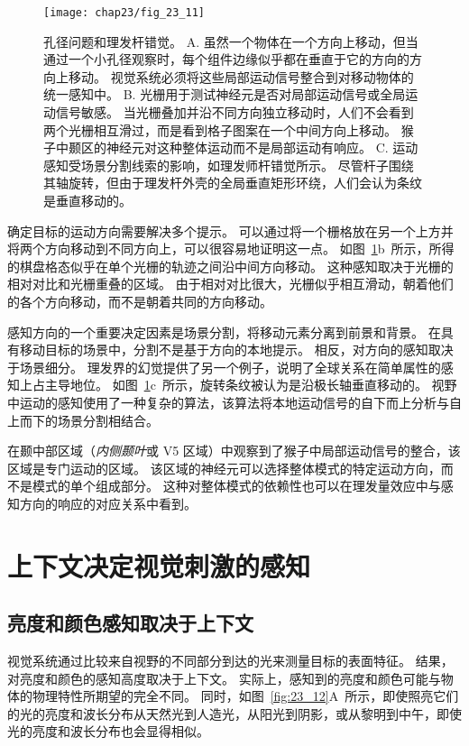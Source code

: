 \begin{figure}[htbp]
	\centering
	\texttt{[image: chap23/fig\_23\_11]}
	\caption{孔径问题和理发杆错觉。
		A. 虽然一个物体在一个方向上移动，但当通过一个小孔径观察时，每个组件边缘似乎都在垂直于它的方向的方向上移动。
		视觉系统必须将这些局部运动信号整合到对移动物体的统一感知中。
		B. 光栅用于测试神经元是否对局部运动信号或全局运动信号敏感。
		当光栅叠加并沿不同方向独立移动时，人们不会看到两个光栅相互滑过，而是看到格子图案在一个中间方向上移动。
		猴子中颞区的神经元对这种整体运动而不是局部运动有响应。
		C. 运动感知受场景分割线索的影响，如理发师杆错觉所示。
		尽管杆子围绕其轴旋转，但由于理发杆外壳的全局垂直矩形环绕，人们会认为条纹是垂直移动的。}
	\label{fig:23_11}
\end{figure}


确定目标的运动方向需要解决多个提示。
可以通过将一个栅格放在另一个上方并将两个方向移动到不同方向上，可以很容易地证明这一点。
如图~\ref{fig:23_11}b~所示，所得的棋盘格态似乎在单个光栅的轨迹之间沿中间方向移动。
这种感知取决于光栅的相对对比和光栅重叠的区域。
由于相对对比很大，光栅似乎相互滑动，朝着他们的各个方向移动，而不是朝着共同的方向移动。


感知方向的一个重要决定因素是场景分割，将移动元素分离到前景和背景。
在具有移动目标的场景中，分割不是基于方向的本地提示。
相反，对方向的感知取决于场景细分。
理发界的幻觉提供了另一个例子，说明了全球关系在简单属性的感知上占主导地位。
如图~\ref{fig:23_11}c~所示，旋转条纹被认为是沿极长轴垂直移动的。
视野中运动的感知使用了一种复杂的算法，该算法将本地运动信号的自下而上分析与自上而下的场景分割相结合。


在颞中部区域（\textit{内侧颞叶}或 V5 区域）中观察到了猴子中局部运动信号的整合，该区域是专门运动的区域。
该区域的神经元可以选择整体模式的特定运动方向，而不是模式的单个组成部分。
这种对整体模式的依赖性也可以在理发量效应中与感知方向的响应的对应关系中看到。



\section{上下文决定视觉刺激的感知}

\subsection{亮度和颜色感知取决于上下文}

视觉系统通过比较来自视野的不同部分到达的光来测量目标的表面特征。
结果，对亮度和颜色的感知高度取决于上下文。
实际上，感知到的亮度和颜色可能与物体的物理特性所期望的完全不同。
同时，如图~\ref{fig:23_12}A~所示，即使照亮它们的光的亮度和波长分布从天然光到人造光，从阳光到阴影，或从黎明到中午，即使光的亮度和波长分布也会显得相似。


